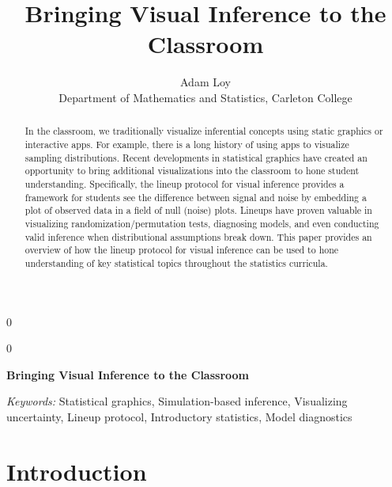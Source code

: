 \documentclass[12pt]{article}
\newcommand{\blind}{0}
\begin{document}
\def\spacingset#1{\renewcommand{\baselinestretch}%
{#1}\small\normalsize} \spacingset{1}



\blind
{
  \title{\bf Bringing Visual Inference to the Classroom}

  \author{
        Adam Loy \\
    Department of Mathematics and Statistics, Carleton College\\
      }
  \maketitle
} \fi

\blind
{
  \bigskip
  \bigskip
  \bigskip
  \begin{center}
    {\LARGE\bf Bringing Visual Inference to the Classroom}
  \end{center}
  \medskip
} \fi

\bigskip
\begin{abstract}
In the classroom, we traditionally visualize inferential concepts using
static graphics or interactive apps. For example, there is a long
history of using apps to visualize sampling distributions. Recent
developments in statistical graphics have created an opportunity to
bring additional visualizations into the classroom to hone student
understanding. Specifically, the lineup protocol for visual inference
provides a framework for students see the difference between signal and
noise by embedding a plot of observed data in a field of null (noise)
plots. Lineups have proven valuable in visualizing
randomization/permutation tests, diagnosing models, and even conducting
valid inference when distributional assumptions break down. This paper
provides an overview of how the lineup protocol for visual inference can
be used to hone understanding of key statistical topics throughout the
statistics curricula.
\end{abstract}

\noindent%
{\it Keywords:} Statistical graphics, Simulation-based inference, Visualizing uncertainty, Lineup protocol, Introductory statistics, Model diagnostics
\vfill

\newpage
\spacingset{1.45} %

\hypertarget{introduction}{%
\section{Introduction}\label{introduction}}
\end{document}
